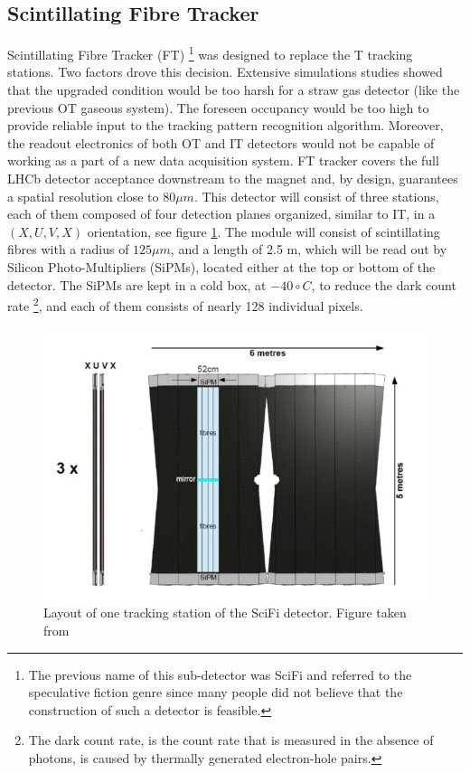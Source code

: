 \subsection{Scintillating Fibre Tracker}

Scintillating Fibre Tracker (FT) \cite{upgrade_tracker_tdr} \footnote{The previous name of this sub-detector was SciFi and referred to the speculative fiction genre since many people did not believe that the construction of such a detector is feasible.} was designed to replace the T tracking stations. Two factors drove this decision. Extensive simulations studies showed that the upgraded condition would be too harsh for a straw gas detector (like the previous OT gaseous system). The foreseen occupancy would be too high to provide reliable input to the tracking pattern recognition algorithm. Moreover, the readout electronics of both OT and IT detectors would not be capable of working as a part of a new data acquisition system. FT tracker covers the full LHCb detector acceptance downstream to the magnet and, by design, guarantees a spatial resolution close to $80 \mu m$. 
This detector will consist of three stations, each of them composed of four detection planes organized, similar to IT,  in a $(X, U, V, X)$ orientation, see figure \ref{fig:SciFI}.
 The module will consist of scintillating fibres with a radius of  $125 \mu m$, and a length of 2.5 m, which will be read out by Silicon Photo-Multipliers (SiPMs), located either at the top or bottom of the detector. The SiPMs are kept in a cold box, at $-40 \circ C$, to reduce the dark count rate \footnote{The dark count rate, is the count rate that is measured in the absence of photons, is caused by thermally generated electron-hole pairs.}, and each of them consists of nearly 128 individual pixels.   


\begin{figure}[!h]
\centering
\includegraphics[scale=0.6]{figures/SciFi.PNG}
\caption{Layout of one tracking station of the SciFi detector. Figure taken from \cite{upgrade_tracker_tdr}
\label{fig:SciFI}}
\end{figure}

